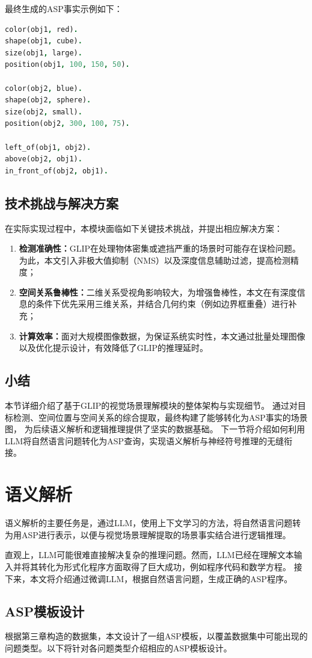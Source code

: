 最终生成的ASP事实示例如下： 
\begin{lstlisting}[language=Prolog] 
color(obj1, red). 
shape(obj1, cube). 
size(obj1, large). 
position(obj1, 100, 150, 50).

color(obj2, blue). 
shape(obj2, sphere). 
size(obj2, small). 
position(obj2, 300, 100, 75).

left_of(obj1, obj2). 
above(obj2, obj1). 
in_front_of(obj2, obj1). 
\end{lstlisting}
\subsection{技术挑战与解决方案}
在实际实现过程中，本模块面临如下关键技术挑战，并提出相应解决方案： 
\begin{enumerate}[label=(\arabic*),itemsep=0.5em] 
    \item \textbf{检测准确性：}GLIP在处理物体密集或遮挡严重的场景时可能存在误检问题。为此，本文引入非极大值抑制（NMS）以及深度信息辅助过滤，提高检测精度； 
    \item \textbf{空间关系鲁棒性：}二维关系受视角影响较大，为增强鲁棒性，本文在有深度信息的条件下优先采用三维关系，并结合几何约束（例如边界框重叠）进行补充； 
    \item \textbf{计算效率：}面对大规模图像数据，为保证系统实时性，本文通过批量处理图像以及优化提示设计，有效降低了GLIP的推理延时。
\end{enumerate}
\subsection{小结}
本节详细介绍了基于GLIP的视觉场景理解模块的整体架构与实现细节。
通过对目标检测、空间位置与空间关系的综合提取，最终构建了能够转化为ASP事实的场景图，
为后续语义解析和逻辑推理提供了坚实的数据基础。
下一节将介绍如何利用LLM将自然语言问题转化为ASP查询，实现语义解析与神经符号推理的无缝衔接。
\section{语义解析}
语义解析的主要任务是，通过LLM，使用上下文学习的方法，将自然语言问题转为用ASP进行表示，以便与视觉场景理解提取的场景事实结合进行逻辑推理。

直观上，LLM可能很难直接解决复杂的推理问题。然而，LLM已经在理解文本输入并将其转化为形式化程序方面取得了巨大成功，例如程序代码\cite{gao2023pal}和数学方程\cite{he2023solving}。
接下来，本文将介绍通过微调LLM，根据自然语言问题，生成正确的ASP程序。
\subsection{ASP模板设计}
根据第三章构造的数据集，本文设计了一组ASP模板，以覆盖数据集中可能出现的问题类型。以下将针对各问题类型介绍相应的ASP模板设计。
